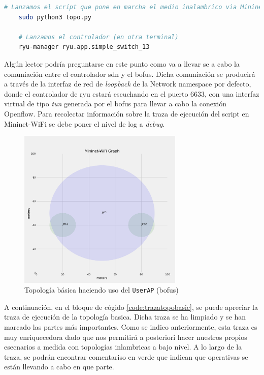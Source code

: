 \begin{lstlisting}[language= bash, style=Consola, caption={Puesta en marcha del escenario básico},label=code:topoBasic]
    # Lanzamos el script que pone en marcha el medio inalambrico via Mininet-WiFi
    sudo python3 topo.py
   
    # Lanzamos el controlador (en otra terminal)
    ryu-manager ryu.app.simple_switch_13
\end{lstlisting}
\vspace{0.5cm}

Algún lector podría preguntarse en este punto como va a llevar se a cabo la comuniación entre el controlador \gls{sdn} y el \gls{bofus}. Dicha comuniación se producirá a través de la interfaz de red de \textit{loopback} de la Network namespace por defecto, donde el controlador de ryu estará escuchando en el puerto 6633, con una interfaz virtual de tipo \textit{tun} generada por el \gls{bofus} para llevar a cabo la conexión Openflow.  Para recolectar información sobre la traza de ejecución del script en Mininet-WiFi se debe poner el nivel de log a \textit{debug}.

\begin{figure}[ht]
    \centering
    \includegraphics[width=0.7\textwidth]{archivos/img/analisis/topoBasic.png}
    \caption{Topología básica haciendo uso del \texttt{UserAP} (\gls{bofus})}
    \label{fig:topoBasic}
\end{figure}


A continuación, en el bloque de cógido \ref{code:trazatopobasic}, se puede apreciar la traza de ejecución de la topología basica. Dicha traza se ha limpiado y se han marcado las partes más importantes. Como se indico anteriormente, esta traza es muy enriquecedora dado que nos permitirá a posteriori hacer nuestros propios esecnarios a medida con topologías inlambricas a bajo nivel. A lo largo de la traza, se podrán encontrar comentariso en verde que indican que operativas se están llevando a cabo en que parte. 


